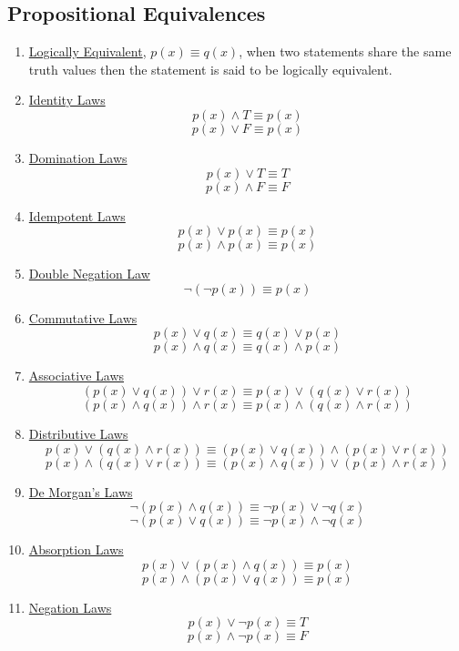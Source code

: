 \documentclass[12pt]{article}
\begin{document}
\quad

\quad

\subsection{Propositional Equivalences}

\begin{enumerate}
\item \underline{Logically Equivalent}, $p(x) \equiv q(x)$, when two statements share the same truth values then the statement is said to be logically equivalent.
\item \underline{Identity Laws} 
\[
	p(x) \wedge T \equiv p(x)
\]
\[
	p(x) \lor F \equiv p(x)
\]

\item \underline{Domination Laws}
\[
	p(x) \lor T \equiv T 
\]
\[
	p(x) \wedge F \equiv F
\]

\item \underline{Idempotent Laws}
\[
	p(x) \lor p(x) \equiv p(x)
\]
\[
	p(x) \wedge p(x) \equiv p(x)
\]

\item \underline{Double Negation Law}
\[
	\neg (\neg p(x)) \equiv p(x)
\]

\item \underline{Commutative Laws}
\[
	p(x) \lor q(x) \equiv q(x) \lor p(x) 
\]
\[
	p(x) \wedge q(x) \equiv q(x) \wedge p(x)
\]

\item \underline{Associative Laws}
\[
	\left ( p(x) \lor q(x) \right ) \lor r(x) \equiv  p(x) \lor \left ( q(x)  \lor r(x) \right )
\]
\[
	\left ( p(x) \wedge q(x) \right ) \wedge r(x) \equiv  p(x) \wedge \left ( q(x)  \wedge r(x) \right )
\]

\item \underline{Distributive Laws}
\[
	p(x) \lor \left ( q(x)  \wedge r(x) \right ) \equiv \left ( p(x) \lor q(x) \right ) \wedge \left ( p(x) \lor r(x) \right )
\]
\[
	p(x) \wedge \left ( q(x)  \lor r(x) \right ) \equiv \left ( p(x) \wedge q(x) \right ) \lor \left ( p(x) \wedge r(x) \right )
\]

\item \underline{De Morgan's Laws}
\[
	\neg \left ( p(x) \wedge q(x) \right ) \equiv \neg p(x) \lor \neg q(x)
\]
\[
	\neg \left ( p(x) \lor q(x) \right ) \equiv \neg p(x) \wedge \neg q(x)
\]

\item \underline{Absorption Laws}
\[
	p(x) \lor \left ( p(x) \wedge q(x) \right ) \equiv p(x)
\]
\[
	p(x) \wedge \left ( p(x) \lor q(x) \right ) \equiv p(x)
\]

\item \underline{Negation Laws}
\[
	p(x) \lor \neg p(x) \equiv T
\]
\[
	p(x) \wedge \neg p(x) \equiv F
\]

\end{enumerate}
\end{document}
